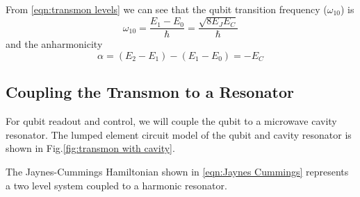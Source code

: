 From \ref{eqn:transmon levels} we can see that the qubit transition frequency ($\omega_{10}$) is
\begin{equation}
\omega_{10}=\frac{E_1-E_0}{\hbar}=\frac{\sqrt{8E_JE_C}}{\hbar}
\end{equation}
and the anharmonicity
\begin{equation}
\alpha=(E_2-E_1)-(E_1-E_0)=-E_C
\end{equation}

\subsection{Coupling the Transmon to a Resonator}

For qubit readout and control, we will couple the qubit to a microwave cavity resonator. The lumped element circuit model of the qubit and cavity resonator is shown in Fig.\ref{fig:transmon with cavity}.

The Jaynes-Cummings Hamiltonian shown in \ref{eqn:Jaynes Cummings} represents a two level system coupled to a harmonic resonator.